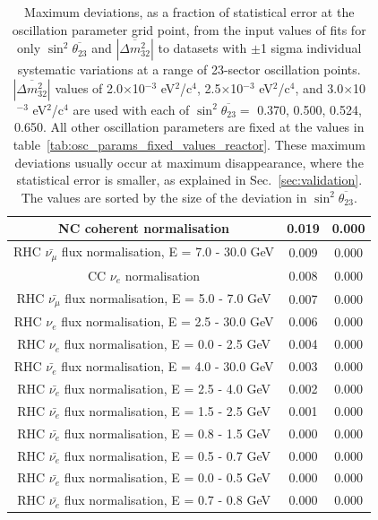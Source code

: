 \begin{table}
\begin{tabular}{| c | c | c |}
                                                               NC coherent normalisation & 0.019 & 0.000 \\ \hline 
                              RHC $\bar{\nu_\mu}$ flux normalisation, E = 7.0 - 30.0 GeV & 0.009 & 0.000 \\ \hline 
                                                              CC $\nu_{e}$ normalisation & 0.008 & 0.000 \\ \hline 
                               RHC $\bar{\nu_\mu}$ flux normalisation, E = 5.0 - 7.0 GeV & 0.007 & 0.000 \\ \hline 
                                      RHC $\nu_e$ flux normalisation, E = 2.5 - 30.0 GeV & 0.006 & 0.000 \\ \hline 
                                       RHC $\nu_e$ flux normalisation, E = 0.0 - 2.5 GeV & 0.004 & 0.000 \\ \hline 
                                RHC $\bar{\nu_e}$ flux normalisation, E = 4.0 - 30.0 GeV & 0.003 & 0.000 \\ \hline 
                                 RHC $\bar{\nu_e}$ flux normalisation, E = 2.5 - 4.0 GeV & 0.002 & 0.000 \\ \hline 
                                 RHC $\bar{\nu_e}$ flux normalisation, E = 1.5 - 2.5 GeV & 0.001 & 0.000 \\ \hline 
                                 RHC $\bar{\nu_e}$ flux normalisation, E = 0.8 - 1.5 GeV & 0.000 & 0.000 \\ \hline 
                                 RHC $\bar{\nu_e}$ flux normalisation, E = 0.5 - 0.7 GeV & 0.000 & 0.000 \\ \hline 
                                 RHC $\bar{\nu_e}$ flux normalisation, E = 0.0 - 0.5 GeV & 0.000 & 0.000 \\ \hline 
                                 RHC $\bar{\nu_e}$ flux normalisation, E = 0.7 - 0.8 GeV & 0.000 & 0.000 \\ \hline 
                            
\hline
\end{tabular}
\caption{
  Maximum deviations, as a fraction of statistical error at the oscillation
  parameter grid point, from the input values of fits for only $\sin^2\overline{\theta_{23}}$ and $|\overline{\Delta m^2_{32}}|$ to datasets with 
  $\pm$1 sigma individual systematic variations at a range of 23-sector oscillation points.
  $|\overline{\Delta m^2_{32}}|$ values of
  2.0$\times$10$^{-3}$ eV$^{2}$/c$^{4}$,
  2.5$\times$10$^{-3}$ eV$^{2}$/c$^{4}$, and
  3.0$\times$10$^{-3}$ eV$^{2}$/c$^{4}$
  are used with each of
  $\sin^2\overline{\theta_{23}} = $ 
  0.370, 0.500, 0.524, 0.650.
  All other oscillation parameters are fixed at the values in table~\ref{tab:osc_params_fixed_values_reactor}.
  These maximum deviations usually occur at maximum disappearance, where the statistical error is smaller, as explained in
  Sec.~\ref{sec:validation}. The values are sorted by the size of the deviation in $\sin^2\overline{\theta_{23}}$.
}
\label{tab:star_summary_by_mixing}
\end{table}

